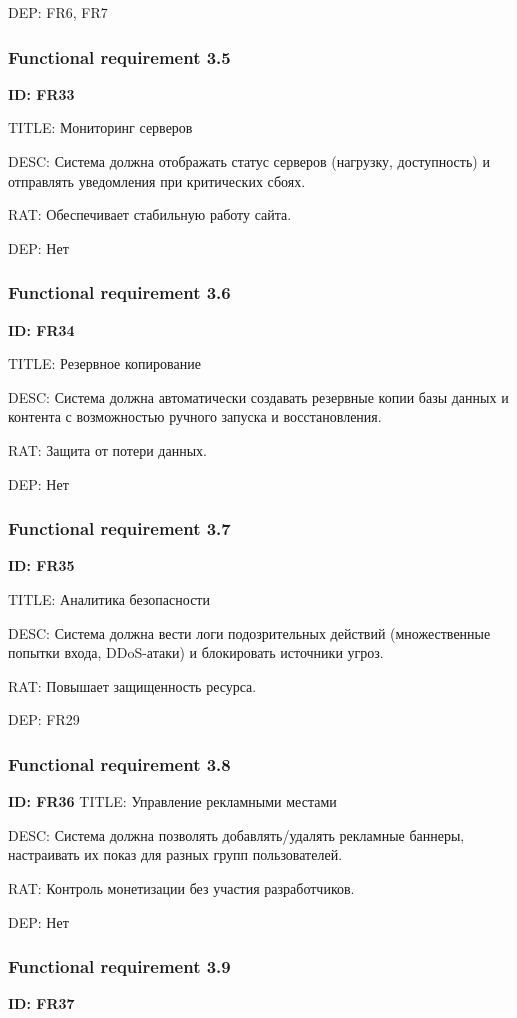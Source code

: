 \documentclass{scrreprt}
\begin{document}
DEP: FR6, FR7
\subsubsection{Functional requirement 3.5}
\textbf{ID: FR33}

TITLE: Мониторинг серверов

DESC: Система должна отображать статус серверов (нагрузку, доступность) и отправлять уведомления при критических сбоях.

RAT: Обеспечивает стабильную работу сайта.

DEP: Нет
\subsubsection{Functional requirement 3.6}
\textbf{ID: FR34}

TITLE: Резервное копирование

DESC: Система должна автоматически создавать резервные копии базы данных и контента с возможностью ручного запуска и восстановления.

RAT: Защита от потери данных.

DEP: Нет
\subsubsection{Functional requirement 3.7}
\textbf{ID: FR35}

TITLE: Аналитика безопасности

DESC: Система должна вести логи подозрительных действий (множественные попытки входа, DDoS-атаки) и блокировать источники угроз.

RAT: Повышает защищенность ресурса.

DEP: FR29
\subsubsection{Functional requirement 3.8}
\textbf{ID: FR36}
TITLE: Управление рекламными местами

DESC: Система должна позволять добавлять/удалять рекламные баннеры, настраивать их показ для разных групп пользователей.

RAT: Контроль монетизации без участия разработчиков.

DEP: Нет
\subsubsection{Functional requirement 3.9}
\textbf{ID: FR37}
\end{document}
